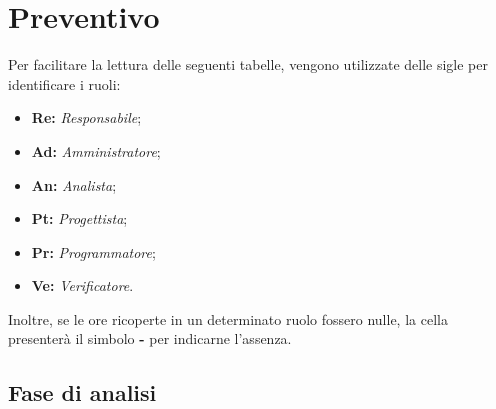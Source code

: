 \section{Preventivo}
Per facilitare la lettura delle seguenti tabelle, vengono utilizzate delle sigle 
per identificare i ruoli:
\begin{itemize}
\item \textbf{Re:} \textit{Responsabile};
\item \textbf{Ad:} \textit{Amministratore};
\item \textbf{An:} \textit{Analista};
\item \textbf{Pt:} \textit{Progettista};
\item \textbf{Pr:} \textit{Programmatore};
\item \textbf{Ve:} \textit{Verificatore}.
\end{itemize}
\noindent
Inoltre, se le ore ricoperte in un determinato ruolo fossero nulle, la cella 
presenterà il simbolo \textbf{-} per indicarne l'assenza. 

\subsection{Fase di analisi}
